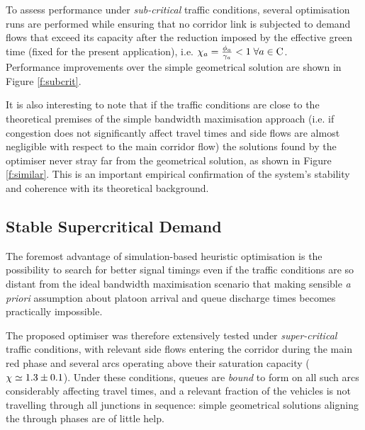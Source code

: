 To assess performance under \emph{sub-critical} traffic conditions, several optimisation runs are performed while ensuring that no corridor link is subjected to demand flows that exceed its capacity after the reduction imposed by the effective green time (fixed for the present application), i.e. $\chi_{a} = \frac{\phi_a}{\gamma_a} < 1 \; \forall a \in \mathrm{C}$.\\
Performance improvements over the simple geometrical solution are shown in Figure \ref{f:subcrit}.


It is also interesting to note that if the traffic conditions are close to the theoretical premises of the simple bandwidth maximisation approach (i.e. if congestion does not significantly affect travel times and side flows are almost negligible with respect to the main corridor flow) the solutions found by the optimiser never stray far from the geometrical solution, as shown in Figure \ref{f:similar}. This is an important empirical confirmation 
of the system's stability and coherence with its theoretical background. 

\subsection{Stable Supercritical Demand}
The foremost advantage of simulation-based heuristic optimisation is the possibility to search for better signal timings even if the traffic conditions are so distant from the ideal bandwidth maximisation scenario that making sensible \emph{a priori} assumption about platoon arrival and queue discharge times becomes practically impossible.

The proposed optimiser was therefore extensively tested under \emph{super-critical} traffic conditions, with relevant side flows entering the corridor during the main red phase and several arcs operating above their saturation capacity ($\chi \simeq 1.3 \pm 0.1$). Under these conditions, queues are \emph{bound} to form on all such arcs considerably affecting travel times, and a relevant fraction of the vehicles is not travelling through all junctions in sequence: simple geometrical solutions aligning the through phases are of little help.

